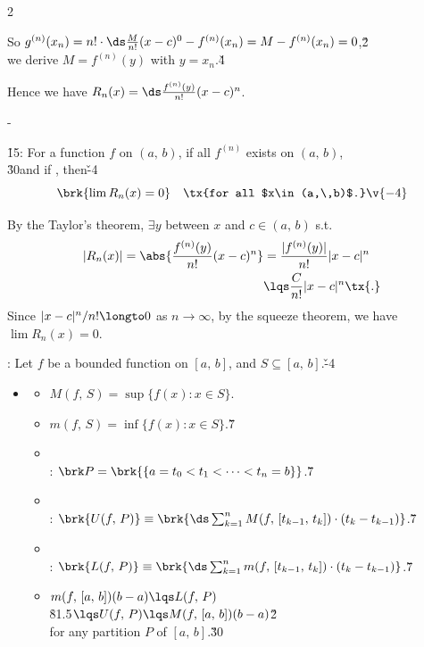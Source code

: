 \documentclass[dvipdfmx,a4paper,titlepage,9pt]{jsarticle}
\begin{document}
\begin{multicols*}{2}
\begin{Pfbox}
So $g^{(n)}(x_n)=n!\cdot\ds\frac M{n!}(x-c)^0-f^{(n)}(x_n)=M-f^{(n)}(x_n)=0$,\v2\\
we derive $M=f^{(n)}(y)$ with $y=x_n$.\v4

Hence we have $R_n(x)=\ds\frac{f^{(n)}(y)}{n!}(x-c)^n$.
\end{Pfbox}\;

- 

\h{15}: For a function $f$ on $(a,\,b)$, if all $f^{(n)}$ exists on $(a,\,b)$,\\
\h{30}and if , then\v{-4}
$$\brk{\lim R_n(x)=0}\quad\tx{for all $x\in(a,\,b)$.}\v{-4}$$

\begin{Pfbox}
By the Taylor's theorem, $\exists y$ between $x$ and $c\in(a,\,b)$ s.t.
$$\begin{aligned}
|R_n(x)|=\abs{\frac{f^{(n)}(y)}{n!}(x-c)^n}&=\frac{|f^{(n)}(y)|}{n!}|x-c|^n\\
&\lqs\frac C{n!}|x-c|^n\tx{.}
\end{aligned}$$
Since $|x-c|^n/n!\longto 0$ as $n\to\infty$, by the squeeze theorem, we have $\lim R_n(x)=0$.
\end{Pfbox}

\newpage



: Let $f$ be a bounded function on $[a,\,b]$, and $S\subseteq[a,\,b]$.\v{-4}
\begin{itemize}[label={-}]
\item{}
\begin{itemize}[label=\Cdot]
\setlength{\leftskip}{-10pt}
\item $M(f,\,S)=\sup{}\{f(x):x\in S\}$.
\item $m(f,\,S)=\inf{}\{f(x):x\in S\}$.\v7
\item {}\\
: $\brk P=\brk{\{a=t_0<t_1<\cdots<t_n=b\}}$.\v7
\item {}\\
: $\brk{U(f,\,P)}\equiv\brk{\ds\sum_{k=1}^nM(f,\,[t_{k-1},\,t_k])\cdot(t_k-t_{k-1})}$.\v7
\item {}\\
: $\brk{L(f,\,P)}\equiv\brk{\ds\sum_{k=1}^nm(f,\,[t_{k-1},\,t_k])\cdot(t_k-t_{k-1})}$.\v7
\item $m(f,\,[a,\,b])(b-a)\lqs L(f,\,P)$\\
\h{81.5}$\lqs U(f,\,P)\lqs M(f,\,[a,\,b])(b-a)$\v2\\
for any partition $P$ of $[a,\,b]$.\v{30}


\end{itemize}
\end{itemize}
\end{multicols*}
\end{document}
